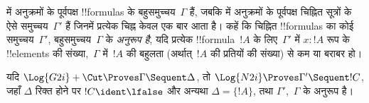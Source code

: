 \documentclass[../../../include/open-logic-section]{subfiles}
\begin{document}


 में अनुक्रमों के पूर्वपक्ष !!{formula}s के बहुसमुच्चय~$\Gamma$ हैं,
जबकि  में अनुक्रमों के पूर्वपक्ष चिह्नित सूत्रों के ऐसे
समुच्चय~$\Gamma'$ हैं जिनमें प्रत्येक चिह्न केवल एक बार आता है। कहें कि
चिह्नित !!{formula}s का कोई समुच्चय~$\Gamma'$, बहुसमुच्चय~$\Gamma$ के
\emph{अनुरूप है}, यदि प्रत्येक !!{formula}~$!A$ के लिए~$\Gamma'$ में $x :
!A$ रूप के !!{element}s की संख्या,~$\Gamma$ में~$!A$ की बहुलता (अर्थात्~$!A$
की प्रतियों की संख्या) से कम या बराबर हो।

\begin{prop}
यदि $\Log{G2i} + \Cut \Proves \Gamma \Sequent \Delta$, तो $\Log{N2i}
\Proves \Gamma' \Sequent !C$, जहाँ $\Delta$ रिक्त होने पर $!C \ident
\lfalse$ और अन्यथा $\Delta = \{!A\}$, तथा $\Gamma'$,~$\Gamma$ के अनुरूप है।
\end{prop}
\end{document}
